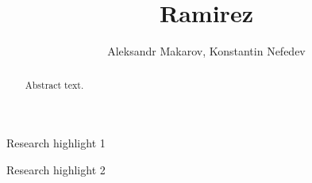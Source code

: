 \documentclass[preprint,12pt]{elsarticle}
\begin{document}
\begin{frontmatter}



\title{Ramirez}


\author{Aleksandr Makarov, Konstantin Nefedev} %


\begin{abstract}
Abstract text.
\end{abstract}

\begin{graphicalabstract}
\end{graphicalabstract}

\begin{highlights}
\item Research highlight 1
\item Research highlight 2
\end{highlights}

\begin{keyword}



\end{keyword}

\end{frontmatter}
\end{document}
